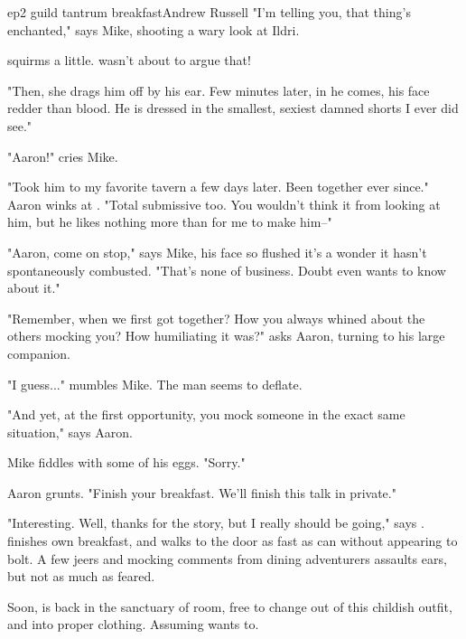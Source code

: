 \documentclass{book}
\begin{document}
\begin{childnode}{ep2 guild tantrum breakfast}{Andrew Russell}
    "I'm telling you, that thing's enchanted," says Mike, shooting a wary look at Ildri.

    \name{} squirms a little. \HeShe{} wasn't about to argue that!

    "Then, she drags him off by his ear. Few minutes later, in he comes, his face redder than blood. He is dressed in the smallest, sexiest damned shorts I ever did see."

    "Aaron!" cries Mike.


    "Took him to my favorite tavern a few days later. Been together ever since." Aaron winks at \name{}. "Total submissive too. You wouldn't think it from looking at him, but he likes nothing more than for me to make him--"

    "Aaron, come on stop," says Mike, his face so flushed it's a wonder it hasn't spontaneously combusted. "That's none of \hisher{} business. Doubt \heshe{} even wants to know about it."

    "Remember, when we first got together? How you always whined about the others mocking you? How humiliating it was?" asks Aaron, turning to his large companion.

    "I guess..." mumbles Mike. The man seems to deflate.

    "And yet, at the first opportunity, you mock someone in the exact same situation," says Aaron.

    Mike fiddles with some of his eggs. "Sorry."

    Aaron grunts. "Finish your breakfast. We'll finish this talk in private."

    "Interesting. Well, thanks for the story, but I really should be going," says \name{}. \HeShe{} finishes \hisher{} own breakfast, and walks to the door as fast as \heshe{} can without appearing 
    to bolt. A few jeers and mocking comments from dining adventurers assaults \hisher{} 
    ears, but not as much as \heshe{} feared. 

    Soon, \heshe{} is back in the sanctuary of \hisher{} room, free to change out of this childish outfit, and into \hisher{} proper clothing. Assuming \heshe{} wants to.

\end{childnode}
\end{document}
